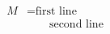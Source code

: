 \documentclass[noamsthm]{beamer}
\begin{document}
\begin{equation}
    \begin{split}
        M &= \text{first line} \\ &\qquad \text{second line}
    \end{split}
\end{equation}
\end{document}
